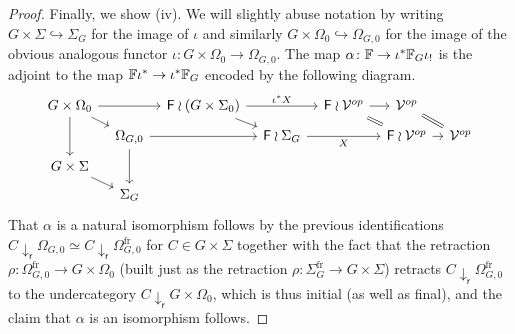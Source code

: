 \documentclass[a4paper,10pt]{article}%
\begin{document}
\begin{proof}
  Finally, we show (iv). We will slightly abuse notation by writing 
  $G \times \Sigma \hookrightarrow \Sigma_G$ for the image of $\iota$
  and similarly
  $G \times \Omega_0 \hookrightarrow \Omega_{G,0}$ for the image of the obvious analogous functor
  $\iota \colon G \times \Omega_0 \to \Omega_{G,0}$.
  The map 
  $\alpha \colon \mathbb{F} \to \iota^{\**} \mathbb{F}_G \iota_{!}$
  is the adjoint to the map 
  $\mathbb{F} \iota^{\**} \to \iota^{\**} \mathbb{F}_G$ encoded by the following diagram.
  \begin{equation}\label{MONADEQUIV DEF}
    \begin{tikzcd}[row sep=5pt, column sep =8pt]
      G \times \Omega_0	\ar{dd} \ar{rd} \ar{rr} &&
      \Fin \wr (G \times \Sigma_0) \ar{rd}  \ar{rr}{\iota^{\**} X}&&
      \Fin \wr \mathcal{V}^{op} \ar{r} \ar[equal]{rd}&
      \mathcal{V}^{op} \ar[equal]{rd}
      \\
      & \Omega_{G,0} \ar{dd} \ar{rr} &&
      \Fin \wr \Sigma_G  \ar{rr}[swap]{X} &&
      \Fin \wr \mathcal{V}^{op} \ar{r} &
      \mathcal{V}^{op}
      \\
      G \times \Sigma \ar{rd} 
      \\
      & \Sigma_G
    \end{tikzcd}
  \end{equation}
  That 
  $\alpha$
  is a natural isomorphism
  follows by the previous identifications 
  $C \downarrow_{\mathsf{r}} \Omega_{G,0} \simeq
  C \downarrow_{\mathsf{r}} \Omega_{G,0}^{\text{fr}}$
  for $C \in G \times \Sigma$
  together with the fact that the retraction 
  $\rho \colon \Omega_{G,0}^{\text{fr}} \to G \times \Omega_0$
  (built just as the retraction
  $\rho \colon \Sigma_G^{\text{fr}} \to G \times \Sigma$)
  retracts 
  $C \downarrow_{\mathsf{r}} \Omega_{G,0}^{\text{fr}}$
  to the undercategory
  $C \downarrow_{\mathsf{r}} G \times \Omega_0$, which is thus initial (as well as final), and the claim that $\alpha$ is an isomorphism follows.


\end{proof}
\end{document}
